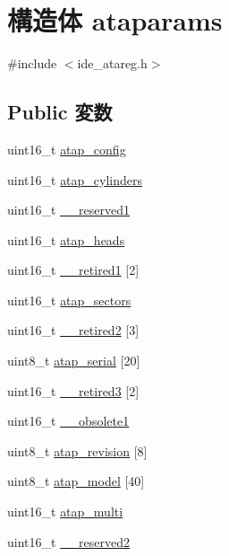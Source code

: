 \hypertarget{structataparams}{
\section{構造体 ataparams}
\label{structataparams}
}


{\ttfamily \#include $<$ide\_\-atareg.h$>$}\subsection*{Public 変数}
\begin{DoxyCompactItemize}
\item 
uint16\_\-t \hyperlink{structataparams_ac0e880942c383a19ad861d923319f78a}{atap\_\-config}
\item 
uint16\_\-t \hyperlink{structataparams_a7abbec036cc95d2afd40700411da1d34}{atap\_\-cylinders}
\item 
uint16\_\-t \hyperlink{structataparams_a2df08b894af326c0b17abc1bc54097f3}{\_\-\_\-reserved1}
\item 
uint16\_\-t \hyperlink{structataparams_a32f5c3fe0fedd30e7430fd78eb347750}{atap\_\-heads}
\item 
uint16\_\-t \hyperlink{structataparams_a3415456fc362679eae9bf575e090aba4}{\_\-\_\-retired1} \mbox{[}2\mbox{]}
\item 
uint16\_\-t \hyperlink{structataparams_aea2e9a1373bc2e48360c489b6a980f73}{atap\_\-sectors}
\item 
uint16\_\-t \hyperlink{structataparams_a0b34079696b0cd01b57438e45c86a66d}{\_\-\_\-retired2} \mbox{[}3\mbox{]}
\item 
uint8\_\-t \hyperlink{structataparams_a36ca7978b41d5cd5dd9dae079fb42b27}{atap\_\-serial} \mbox{[}20\mbox{]}
\item 
uint16\_\-t \hyperlink{structataparams_ab1a42b0e2c2cdc1b1387e753c7e6cb19}{\_\-\_\-retired3} \mbox{[}2\mbox{]}
\item 
uint16\_\-t \hyperlink{structataparams_ada567c8d580774d8dbc4af322c07ab8d}{\_\-\_\-obsolete1}
\item 
uint8\_\-t \hyperlink{structataparams_a3f32f91678264ba9c34def1c14203400}{atap\_\-revision} \mbox{[}8\mbox{]}
\item 
uint8\_\-t \hyperlink{structataparams_a00e967bbcc15120c0e7b6ad5defd6383}{atap\_\-model} \mbox{[}40\mbox{]}
\item 
uint16\_\-t \hyperlink{structataparams_a31d9f08382d53e4d5e0aaf60715d53fe}{atap\_\-multi}
\item 
uint16\_\-t \hyperlink{structataparams_a012b1dd83bc900d831da16a829adb238}{\_\-\_\-reserved2}

\end{DoxyCompactItemize}

